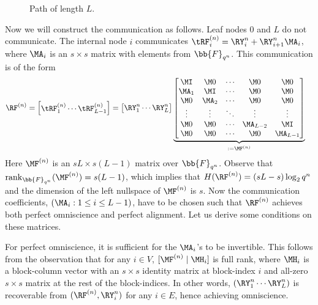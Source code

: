  \begin{figure}[h]
\centering

\caption{Path of length $L$.}
\label{fig:path_model}
 \end{figure}
 
 Now we will construct the  communication as follows. Leaf nodes $0$ and $L$ do not communicate. The internal node $i$ communicates $\tRF_i^{(n)} = \RY^n_{i} + \RY^n_{i+1}\MA_{i}$, where $\MA_{i}$ is an $s \times s$ matrix with elements from $\bb{F}_{q^n}$. This  communication is of the form
\begin{align*}
\RF^{(n)} & = \begin{bmatrix}
\tRF_1^{(n)} \cdots \tRF_{L-1}^{(n)}
\end{bmatrix} = \begin{bmatrix}
\RY_1^{n}\cdots \RY_L^{n}
\end{bmatrix} \underbrace{\begin{bmatrix}
\MI & \M0& \cdots  &\M0&\M0\\
\MA_1&\MI &  \cdots &\M0&\M0\\
\M0&{\MA_2} & \cdots &\M0&\M0\\
\vdots&\vdots&\ddots&\vdots&\vdots\\
 \M0 &\M0&\cdots&\MA_{L-2}&\MI  \\
\M0 &\M0&\cdots& \M0&\MA_{L-1} \\
\end{bmatrix}}_{:=\MF^{(n)}}
\end{align*}
Here $\MF^{(n)}$ is an $sL \times s(L-1) $ matrix over $\bb{F}_{q^n}$. Observe that $\rank_{\bb{F}_{q^n}}(\MF^{(n)})= s(L-1)$, which implies that $H( \RF^{(n)}) =\left(sL - s\right) \log_2q^n$ and  the dimension of the left nullspace of $\MF^{(n)}$ is $s$. Now the communication coefficients, $(\MA_i : 1\leq i\leq L-1)$, have to be chosen such that $\RF^{(n)}$ achieves both perfect omniscience and perfect alignment. Let us derive some conditions on these matrices.

For  perfect  omniscience,  it  is  sufficient  for  the $\MA_i$'s  to  be invertible. 
This follows from the observation that for any $i \in V$, $[\MF^{(n)} \mid \MH_i]$  is  full rank,  where $\MH_i$ is a block-column vector with an $s \times s$ identity matrix at block-index $i$ and all-zero $s \times s$ matrix at the rest of the block-indices. In other words, $(\RY_1^{n}\cdots \RY_L^{n})$ is recoverable from $(\RF^{(n)},  \RY_i^n)$ for any $i \in E$, hence achieving omniscience. 

